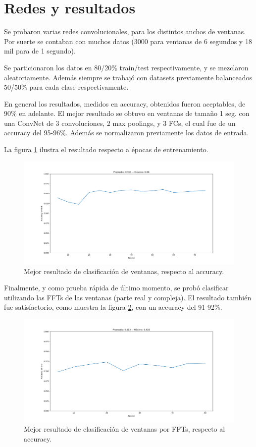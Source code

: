 \documentclass[a4paper,twocolumn]{article}
\begin{document}
\section{Redes y resultados}
Se probaron varias redes convolucionales, para los distintos anchos de ventanas. Por suerte se contaban con muchos datos (3000 para ventanas de 6 segundos y 18 mil para de 1 segundo).

Se particionaron los datos en 80/20\% train/test respectivamente, y se mezclaron aleatoriamente. Además siempre se trabajó con datasets previamente balanceados 50/50\% para cada clase respectivamente.

En general los resultados, medidos en accuracy, obtenidos fueron aceptables, de 90\% en adelante. El mejor resultado se obtuvo en ventanas de tamaño 1 seg. con una ConvNet de 3 convoluciones, 2 max poolings, y 3 FCs, el cual fue de un accuracy del 95-96\%. Además se normalizaron previamente los datos de entrada.

La figura \ref{clasif} ilustra el resultado respecto a épocas de entrenamiento.
\begin{figure}[h]
	\includegraphics[trim={3cm 1cm 3cm 1cm}, clip,width=.5\textwidth]{./cnn_v7_1seg_normalizado_b5000.png}
	\caption{Mejor resultado de clasificación de ventanas, respecto al accuracy.}
	\label{clasif}
\end{figure}


Finalmente, y como prueba rápida de último momento, se probó clasificar utilizando las FFTs de las ventanas (parte real y compleja). El resultado también fue satisfactorio, como muestra la figura \ref{clasifFFT}, con un accuracy del 91-92\%.
\begin{figure}[h]
	\includegraphics[trim={3cm 1cm 3cm 1cm}, clip,width=.5\textwidth]{./cnn_v7_1seg_normalizado_fft_b1000.png}
	\caption{Mejor resultado de clasificación de ventanas por FFTs, respecto al accuracy.}
	\label{clasifFFT}
\end{figure}
\end{document}

